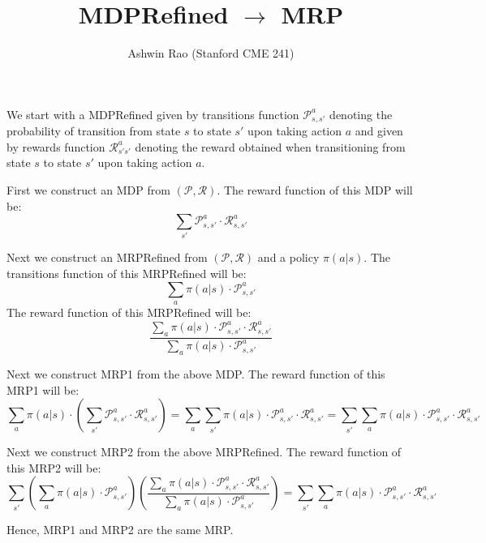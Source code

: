 \documentclass[12pt]{amsart}
\title{MDPRefined $\rightarrow$ MRP}
\author{Ashwin Rao (Stanford CME 241)}
\date{} %
\begin{document}
\maketitle

We start with a MDPRefined given by transitions function $\mathcal{P}_{s,s'}^a$ denoting the probability of transition from state $s$ to state $s'$ upon taking action $a$ and given by rewards function $\mathcal{R}_{s's'}^a$ denoting the reward obtained when transitioning from state $s$ to state $s'$ upon taking action $a$.

First we construct an MDP from $(\mathcal{P}, \mathcal{R})$. The reward function of this MDP will be:
$$\sum_{s'} \mathcal{P}_{s,s'}^a \cdot \mathcal{R}_{s,s'}^a$$

Next we construct an MRPRefined from $(\mathcal{P}, \mathcal{R})$ and a policy $\pi(a|s)$. The transitions function of this MRPRefined will be:
$$\sum_a \pi(a|s) \cdot \mathcal{P}_{s,s'}^a$$
The reward function of this MRPRefined will be:
$$\frac {\sum_a \pi(a|s) \cdot \mathcal{P}_{s,s'}^a \cdot \mathcal{R}_{s,s'}^a} {\sum_a \pi(a|s) \cdot \mathcal{P}_{s,s'}^a}$$

Next we construct MRP1 from the above MDP. The reward function of this MRP1 will be:
$$\sum_a \pi(a|s) \cdot (\sum_{s'} \mathcal{P}_{s,s'}^a \cdot \mathcal{R}_{s,s'}^a) = \sum_a \sum_{s'} \pi(a|s) \cdot \mathcal{P}_{s,s'}^a \cdot \mathcal{R}_{s,s'}^a = \sum_{s'} \sum_a \pi(a|s) \cdot \mathcal{P}_{s,s'}^a \cdot \mathcal{R}_{s,s'}^a $$

Next we construct MRP2 from the above MRPRefined. The reward function of this MRP2 will be:
$$\sum_{s'} (\sum_a \pi(a|s) \cdot \mathcal{P}_{s,s'}^a) (\frac {\sum_a \pi(a|s) \cdot \mathcal{P}_{s,s'}^a \cdot \mathcal{R}_{s,s'}^a} {\sum_a \pi(a|s) \cdot \mathcal{P}_{s,s'}^a}) =  \sum_{s'} \sum_a \pi(a|s) \cdot \mathcal{P}_{s,s'}^a \cdot \mathcal{R}_{s,s'}^a $$

Hence, MRP1 and MRP2 are the same MRP.
\end{document}
